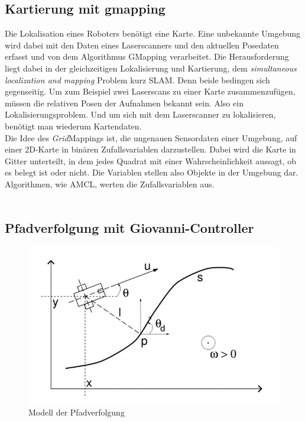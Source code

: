 \documentclass[11pt,a4paper]{article}
\begin{document}
\subsection{Kartierung mit gmapping  \cite{gmapping}}
{
	Die Lokalisation eines Roboters ben\"otigt eine Karte. Eine unbekannte Umgebung wird dabei mit den Daten eines Laserscanners und den aktuellen Posedaten erfasst und von dem Algorithmus GMapping verarbeitet.
	Die Herausforderung liegt dabei in der gleichzeitigen Lokalisierung und Kartierung, dem \textit{simultaneous localization and mapping} Problem kurz SLAM. Denn beide bedingen sich gegenseitig. Um zum Beispiel zwei Laserscans zu einer Karte zusammenzuf\"ugen, m\"ussen die relativen Posen der Aufnahmen bekannt sein. Also ein Lokalisierungsproblem. Und um sich mit dem Laserscanner zu lokalisieren, ben\"otigt man wiederum Kartendaten. \\

	Die Idee des  \textit{Grid}Mappings ist, die ungenauen Sensordaten einer Umgebung, auf einer 2D-Karte in bin\"aren Zufallsvariablen darzustellen. Dabei wird die Karte in Gitter unterteilt, in dem jedes Quadrat mit einer Wahrscheinlichkeit aussagt, ob es belegt ist oder nicht. Die Variablen stellen also Objekte in der Umgebung dar. Algorithmen, wie AMCL, werten die Zufallsvariablen aus. 
	\\ 
	\\

\subsection{Pfadverfolgung mit Giovanni-Controller}


\begin{figure}[h]
	\includegraphics[width=\linewidth]{pictures/Pfadverfolgung.JPG}
	\caption{Modell der Pfadverfolgung}
\end{figure}

}
\end{document}
